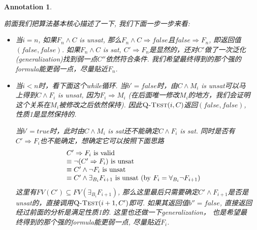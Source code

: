 \documentclass{article}
\newtheorem{annotation}[theorem]{Annotation}
\begin{document}
\begin{annotation}
\begin{itemize}
    前面我们把算法基本核心描述了一下, 我们下面一步一步来看:
    \begin{itemize}
        \item 当$i = n$, 如果$F_n \wedge C$ is unsat, 那么$F_n \wedge C \Rightarrow false$且$false \Rightarrow F_n$, 即返回值$(false, false)$. 如果$F_n \wedge C$ is sat, $C' \Rightarrow F_n$是显然的，还对$C'$做了一次泛化(generalization)找到弱一点$C''$依然符合条件. 我们希望最终得到的那个强的formula能更弱一点，尽量贴近$F_n$. 
        \item 当$i < n$时，看下面这个while循环. 当$b' = false$时，由$C \wedge M_i$ is unsat可以马上得到$C \wedge F_i$ is unsat, 因为$F_i \Rightarrow M_i$ (在后面唯一修改$M_i$的地方，我们会证明这个关系在$M_i$被修改之后依然保持). 因此$\textsc{Q-Test}(i, C)$返回$(false, false)$, 性质1是显然保持的.
        
        当$b' = true$时，此时由$C \wedge M_i$ is sat还不能确定$C \wedge F_i$ is sat. 同时是否有$C' \Rightarrow  F_i$也不能确定，想确定它可以按照下面思路
        \[
            \begin{tabular}{l}
                $C' \Rightarrow  F_i$ is valid \\
                $\equiv \neg (C' \Rightarrow F_i)$ is unsat \\
                $\equiv C' \wedge \neg F_i$ is unsat \\
                $\equiv C' \wedge \exists_{B_i} F_{i+1}$ is unsat (by $F_i = \forall_{B_i} \neg F_{i+1}$)\\
            \end{tabular}
        \]
        这里有$FV(C') \subseteq FV(\exists_{B_i} F_{i+1})$, 那么这里最后只需要确定$C' \wedge F_{i+1}$是否是unsat的，直接调用$\textsc{Q-Test}(i+1, C')$即可. 如果其返回值$b'' = false$, 直接返回经过前面的分析是满足性质1的. 这里也还做一下generalization， 也是希望最终得到的那个强的formula能更弱一点, 尽量贴近$F_i$. 
        

\end{itemize}
\end{itemize}
\end{annotation}
\end{document}

